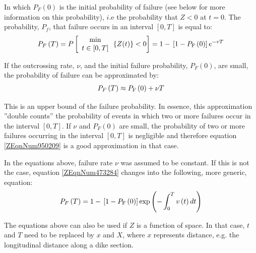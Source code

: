 {In which  $P_F(0)$ is the initial probability of failure (see below for more information on this probability), $i$.e the probability that $Z<0$ at  $t=0$.
The probability, $P_f$, that failure occurs in an interval  $[0,T]$ is equal to:
\begin{align}
P_{F} \left(T\right)=P\left[\begin{array}{c} {\min } \\ {t\in \left[0,T\right]} \end{array} \left\{Z(t)\right\}<0\right]=1-{\rm  }\left[1-P_{{\rm F}} \left(0\right)\right]e^{-vT} \label{ZEqnNum473284} 
\end{align}

If the outcrossing rate, $\nu$, and the initial failure probability,  $P_F(0)$, are small, the probability of failure can be approximated by:
\begin{align}
P_{F} \left(T\right)\approx P_{{\rm F}} \left(0\right)+\nu T\label{ZEqnNum950209} 
\end{align}

This is an upper bound of the failure probability.
In essence, this approximation ''double counts'' the probability of events in which two or more failures occur in the interval  $[0,T]$.
If $\nu$ and  $P_F(0)$ are small, the probability of two or more failures occurring in the interval  $[0,T]$ is negligible and therefore equation \eqref{ZEqnNum950209} is a good approximation in that case.

In the equations above, failure rate $\nu$ was assumed to be constant.
If this is not the case, equation \eqref{ZEqnNum473284} changes into the following, more generic, equation: 
\begin{align}
P_{F} \left(T\right)=1-{\rm  }\left[1-P_{{\rm F}} \left(0\right)\right]\exp \left(-\int _{0}^{T}v\left(t\right)dt \right)\label{ZEqnNum131880} 
\end{align}

The equations above can also be used if $Z$ is a function of space.
In that case, $t$ and $T$ need to be replaced by $x$ and $X$, where $x$ represents distance, e.g. the longitudinal distance along a dike section. 

}
